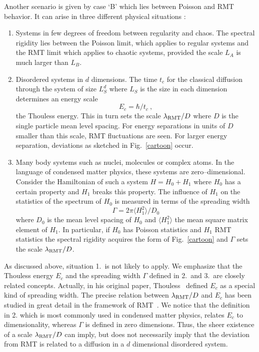 Another scenario is given by case `B' which lies between Poisson and
RMT behavior. It can arise in three different physical situations
\cite{guhr97}:
\begin{enumerate}
\item Systems in few degrees of freedom between regularity and
      chaos. The spectral rigidity lies between the Poisson limit,
      which applies to regular systems and the RMT limit which applies
      to chaotic systems, provided the scale $L_A$ is much larger
      than $L_B$.
\item Disordered systems in $d$ dimensions. The time $t_c$ for the
      classical diffusion through the system of size $L_S^d$ where
      $L_S$ is the size in each dimension determines an energy scale
      \begin{equation}
      E_c = \hbar / t_c \ ,
      \label{thoul}
      \end{equation}
      the Thouless energy. This in turn sets the scale
      $\lambda_{\rm RMT}/D$ where $D$ is the single particle mean
      level spacing. For energy separations in units of $D$ smaller
      than this scale, RMT fluctuations are seen. For larger energy
      separation, deviations as sketched in Fig.~\ref{cartoon} occur.
\item Many body systems such as nuclei, molecules or complex atoms.
      In the language of condensed matter physics, these systems
      are zero--dimensional. Consider the Hamiltonian of such a system
      $H=H_0+H_1$ where $H_0$ has a certain property and $H_1$ breaks this
      property. The influence of $H_1$ on the statistics of the spectrum
      of $H_0$ is measured in terms of the spreading width
      \begin{equation}
      \Gamma = 2\pi \langle H_1^2 \rangle / D_0
      \label{spread}
      \end{equation}
      where $D_0$ is the mean level spacing of $H_0$ and $\langle H_1^2
      \rangle$ the mean square matrix element of $H_1$.  In particular,
      if $H_0$ has Poisson statistics and $H_1$ RMT statistics the
      spectral rigidity acquires the form of Fig.~\ref{cartoon} and
      $\Gamma$ sets the scale $\lambda_{\rm RMT}/D$.
\end{enumerate}

As discussed above, situation 1.~is not likely to apply. We emphasize
that the Thouless energy $E_c$ and the spreading width $\Gamma$
defined in 2.~and 3.~are closely related concepts. Actually, in his
original paper, Thouless~\cite{thou75} defined $E_c$ as a special kind
of spreading width.  The precise relation between $\lambda_{\rm
  RMT}/D$ and $E_c$ has been studied in great detail in the framework
of RMT~\cite{Frahm98}. We notice that the definition in 2. which is
most commonly used in condensed matter physics, relates $E_c$ to
dimensionality, whereas $\Gamma$ is defined in zero dimensions.  Thus,
the sheer existence of a scale $\lambda_{\rm RMT}/D$ can imply, but
does not necessarily imply that the deviation from RMT is related to a
diffusion in a $d$ dimensional disordered system.

